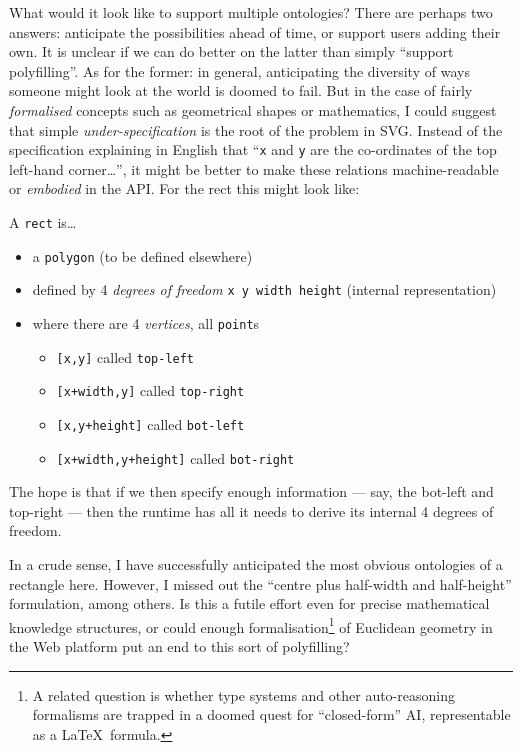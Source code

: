 What would it look like to support multiple ontologies? There are
perhaps two answers: anticipate the possibilities ahead of time, or
support users adding their own. It is unclear if we can do better on the
latter than simply ``support polyfilling''. As for the former: in
general, anticipating the diversity of ways someone might look at the
world is doomed to fail. But in the case of fairly \emph{formalised}
concepts such as geometrical shapes or mathematics, I could suggest that
simple \emph{under-specification} is the root of the problem in SVG.
Instead of the specification explaining in English that ``\texttt{x} and
\texttt{y} are the co-ordinates of the top left-hand corner\ldots{}'',
it might be better to make these relations machine-readable or
\emph{embodied} in the API. For the rect this might look like:

\noindent A \texttt{rect} is\ldots{}

\begin{itemize}
\tightlist
\item
  a \texttt{polygon} (to be defined elsewhere)
\item
  defined by 4 \emph{degrees of freedom} \texttt{x\ y\ width\ height}
  (internal representation)
\item
  where there are 4 \emph{vertices}, all \texttt{point}s

  \begin{itemize}
  \tightlist
  \item
    \texttt{{[}x,y{]}} called \texttt{top-left}
  \item
    \texttt{{[}x+width,y{]}} called \texttt{top-right}
  \item
    \texttt{{[}x,y+height{]}} called \texttt{bot-left}
  \item
    \texttt{{[}x+width,y+height{]}} called \texttt{bot-right}
  \end{itemize}
\end{itemize}

The hope is that if we then specify enough information --- say, the
bot-left and top-right --- then the runtime has all it needs to derive
its internal 4 degrees of freedom.

In a crude sense, I have successfully anticipated the most obvious
ontologies of a rectangle here. However, I missed out the ``centre plus
half-width and half-height'' formulation, among others. Is this a futile
effort even for precise mathematical knowledge structures, or could
enough formalisation\footnote{A related question is whether type systems
  and other auto-reasoning formalisms are trapped in a doomed quest for
  ``closed-form'' AI, representable as a \LaTeX~formula.} of Euclidean
geometry in the Web platform put an end to this sort of polyfilling?


